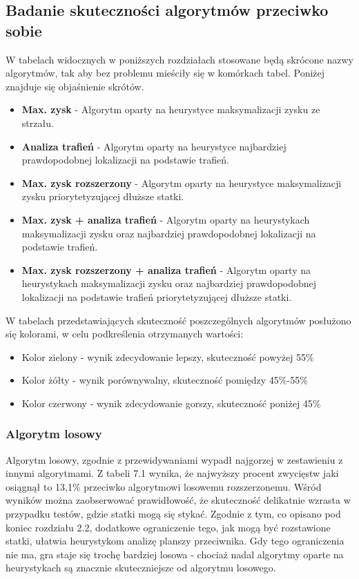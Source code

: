 \subsection{Badanie skuteczności algorytmów przeciwko sobie}
W tabelach widocznych w poniższych rozdziałach stosowane będą skrócone nazwy algorytmów, tak aby bez problemu mieściły się w komórkach tabel. Poniżej znajduje się objaśnienie skrótów.
\begin{itemize}
    \item \textbf{Max. zysk} - Algorytm oparty na heurystyce maksymalizacji zysku ze strzału.
    \item \textbf{Analiza trafień} - Algorytm oparty na heurystyce najbardziej prawdopodobnej lokalizacji na podstawie trafień.
    \item \textbf{Max. zysk rozszerzony} - Algorytm oparty na heurystyce maksymalizacji zysku priorytetyzującej dłuższe statki.
    \item \textbf{Max. zysk + analiza trafień} - Algorytm oparty na heurystykach maksymalizacji zysku oraz najbardziej prawdopodobnej lokalizacji na podstawie trafień.
    \item \textbf{Max. zysk rozszerzony + analiza trafień} - Algorytm oparty na heurystykach maksymalizacji zysku oraz najbardziej prawdopodobnej lokalizacji na podstawie trafień priorytetyzującej dłuższe statki. 
\end{itemize}

W tabelach przedstawiających skuteczność poszczególnych algorytmów posłużono się kolorami, w celu podkreślenia otrzymanych wartości:
\begin{itemize}
    \item Kolor zielony - wynik zdecydowanie lepszy, skuteczność powyżej 55\%
    \item Kolor żółty - wynik porównywalny, skuteczność pomiędzy 45\%-55\%
    \item Kolor czerwony - wynik zdecydowanie gorszy, skuteczność poniżej 45\%
\end{itemize}

\subsubsection{Algorytm losowy}

Algorytm losowy, zgodnie z przewidywaniami wypadł najgorzej w zestawieniu z innymi algorytmami. Z tabeli 7.1 wynika, że najwyższy procent zwycięstw jaki osiągnął to 13,1\% przeciwko algorytmowi losowemu rozszerzonemu. Wśród wyników można zaobserwować prawidłowość, że skuteczność delikatnie wzrasta w przypadku testów, gdzie statki mogą się stykać. Zgodnie z tym, co opisano pod koniec rozdziału 2.2, dodatkowe ograniczenie tego, jak mogą być rozstawione statki, ułatwia heurystykom analizę planszy przeciwnika. Gdy tego ograniczenia nie ma, gra staje się trochę bardziej losowa - chociaż nadal algorytmy oparte na heurystykach są znacznie skuteczniejsze od algorytmu losowego.

